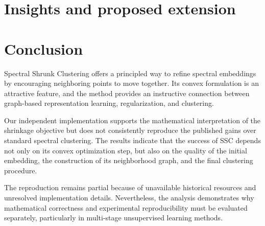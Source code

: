 \documentclass{article}
\begin{document}
\section{Insights and proposed extension}

\section{Conclusion}

Spectral Shrunk Clustering offers a principled way to refine spectral embeddings by encouraging neighboring points to move together. Its convex formulation is an attractive feature, and the method provides an instructive connection between graph-based representation learning, regularization, and clustering.

Our independent implementation supports the mathematical interpretation of the shrinkage objective but does not consistently reproduce the published gains over standard spectral clustering. The results indicate that the success of SSC depends not only on its convex optimization step, but also on the quality of the initial embedding, the construction of its neighborhood graph, and the final clustering procedure.

The reproduction remains partial because of unavailable historical resources and unresolved implementation details. Nevertheless, the analysis demonstrates why mathematical correctness and experimental reproducibility must be evaluated separately, particularly in multi-stage unsupervised learning methods.
\end{document}
